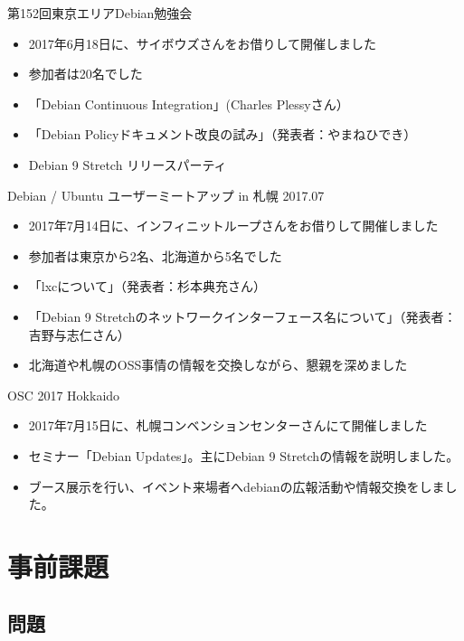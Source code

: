 \begin{frame}{第152回東京エリアDebian勉強会}
\begin{itemize}
\item 2017年6月18日に、サイボウズさんをお借りして開催しました
\item 参加者は20名でした
\item 「Debian Continuous Integration」(Charles Plessyさん）
\item 「Debian Policyドキュメント改良の試み」（発表者：やまねひでき）
  \item Debian 9 Stretch リリースパーティ
\end{itemize} 
\end{frame}

\begin{frame}{Debian / Ubuntu ユーザーミートアップ in 札幌 2017.07}
\begin{itemize}
\item 2017年7月14日に、インフィニットループさんをお借りして開催しました
\item 参加者は東京から2名、北海道から5名でした
\item 「lxcについて」（発表者：杉本典充さん）
\item 「Debian 9 Stretchのネットワークインターフェース名について」（発表者：吉野与志仁さん）
\item 北海道や札幌のOSS事情の情報を交換しながら、懇親を深めました
\end{itemize} 
\end{frame}

\begin{frame}{OSC 2017 Hokkaido}
\begin{itemize}
\item 2017年7月15日に、札幌コンベンションセンターさんにて開催しました
\item セミナー「Debian Updates」。主にDebian 9 Stretchの情報を説明しました。
\item ブース展示を行い、イベント来場者へdebianの広報活動や情報交換をしました。
\end{itemize} 
\end{frame}

\section{事前課題}
{\footnotesize
 
}

\subsection{問題}


